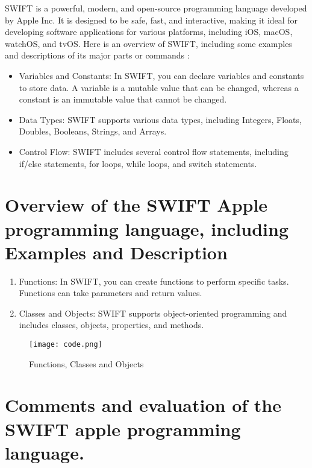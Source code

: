 \documentclass[11pt]{Abdullahmad} %
\begin{document}
SWIFT is a powerful, modern, and open-source programming language developed by Apple Inc. 
It is designed to be safe, fast, and interactive, making it ideal for developing software applications
for various platforms, including iOS, macOS, watchOS, and tvOS. Here is an overview of SWIFT, 
including some examples and descriptions of its major parts or commands \cite{10006854}:

\begin{itemize}
	\item Variables and Constants: In SWIFT, you can declare variables and constants to store data. 
   A variable is a mutable value that can be changed, whereas a constant is an immutable value that
   cannot be changed. \cite{grevisse2020skos}
	\item Data Types: SWIFT supports various data types, including Integers, Floats, Doubles,
  Booleans, Strings, and Arrays. \cite{grevisse2020skos}
	\item Control Flow: SWIFT includes several control flow statements, including if/else statements,
  for loops, while loops, and switch statements.  \cite{grevisse2020skos}
\end{itemize}


\newpage
\section*{Overview of the SWIFT Apple programming language, including Examples
 and Description }

\begin{enumerate}
	\item  Functions: In SWIFT, you can create functions to perform specific tasks. Functions can take
   parameters and return values.
	\item Classes and Objects: SWIFT supports object-oriented programming and includes classes, objects, properties, and methods.
\end{enumerate}
\begin{figure}[h]
        \centering
        \texttt{[image: code.png]}
	\caption{Functions, Classes and Objects}
\end{figure}
\newpage 
\section*{Comments and evaluation of the SWIFT apple programming language.}
\end{document}
